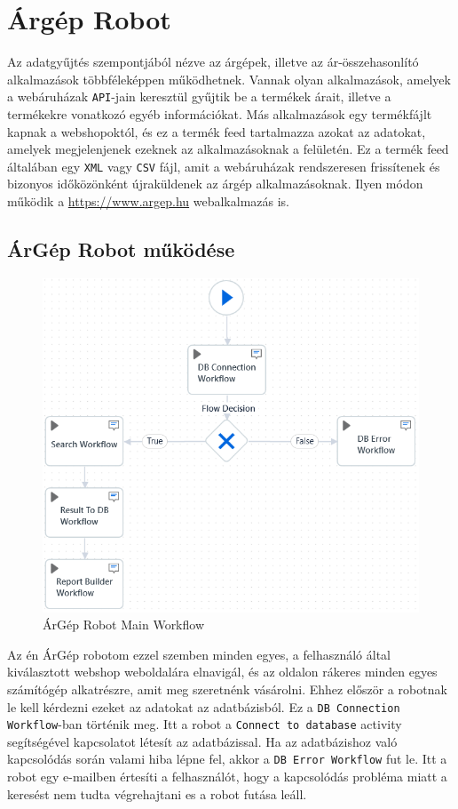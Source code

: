 \documentclass[
]{thesis-ekf}
\theoremstyle{definition}
\theoremstyle{remark}
\begin{document}
\section{Árgép Robot}
Az adatgyűjtés szempontjából nézve az árgépek, illetve az ár-összehasonlító alkalmazások többféleképpen működhetnek. Vannak olyan alkalmazások, amelyek a webáruházak \texttt{API}-jain keresztül gyűjtik be a termékek árait, illetve a termékekre vonatkozó egyéb információkat. 
Más alkalmazások egy termékfájlt kapnak a webshopoktól, és ez a termék feed tartalmazza azokat az adatokat, amelyek megjelenjenek ezeknek az alkalmazásoknak a felületén. Ez a termék feed általában egy \texttt{XML} vagy \texttt{CSV} fájl, amit a webáruházak rendszeresen frissítenek és bizonyos időközönként újraküldenek az árgép alkalmazásoknak. Ilyen módon működik a \url{https://www.argep.hu} webalkalmazás is.

\subsection{ÁrGép Robot működése}

\begin{figure}[!ht]
	\centering
	\includegraphics[width=14cm]{mainWorkflow}
	\caption{ ÁrGép Robot Main Workflow}
	\label{picture-MainWorkFlow}
\end{figure}

Az én ÁrGép robotom ezzel szemben minden egyes, a felhasználó által kiválasztott webshop weboldalára elnavigál, és az oldalon rákeres minden egyes számítógép alkatrészre, amit meg szeretnénk vásárolni. Ehhez először a robotnak le kell kérdezni ezeket az adatokat az adatbázisból. Ez a \texttt{DB Connection Workflow}-ban történik meg. Itt a robot a \texttt{Connect to database} activity segítségével kapcsolatot létesít az adatbázissal. Ha az adatbázishoz való kapcsolódás során valami hiba lépne fel, akkor a \texttt{DB Error Workflow} fut le. Itt a robot egy e-mailben értesíti a felhasználót, hogy a kapcsolódás probléma miatt a keresést nem tudta végrehajtani es a robot futása leáll. 
\end{document}
